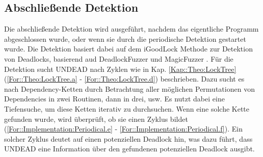 \subsection{Abschließende Detektion} \label{Kap::UNDEAD:Abschließende}
Die abschließende Detektion wird ausgeführt, nachdem das eigentliche Programm
abgeschlossen wurde, oder wenn sie durch die periodische Detektion gestartet wurde.
Die Detektion basiert dabei auf dem iGoodLock Methode 
zur Detektion von Deadlocks, basierend aud DeadlockFuzzer \cite{Joshi} und 
MagicFuzzer \cite{Cai}. Für die Detektion sucht UNDEAD nach Zyklen wie in Kap.
\ref{Kap::Theo:LockTree} (\eqref{For::Theo:LockTree.a} - \eqref{For::Theo:LockTree.d})
beschrieben. Dazu sucht es nach Dependency-Ketten 
durch Betrachtung aller möglichen Permutationen von Dependencies in zwei Routinen, dann 
in drei, usw. Es nutzt dabei 
eine Tiefensuche, um diese Ketten iterativ zu durchsuchen. Wenn eine solche Kette 
gefunden wurde, wird überprüft, ob sie einen Zyklus bildet 
(\eqref{For::Implementation:Periodical.e} - \eqref{For::Implementation:Periodical.f}).
Ein solcher Zyklus deutet auf einen potenziellen Deadlock hin, was dazu 
führt, dass UNDEAD eine Information über den gefundenen potenziellen Deadlock ausgibt.


